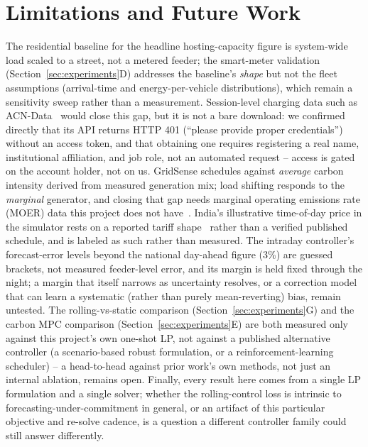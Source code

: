 \documentclass[journal]{IEEEtran}
\begin{document}
\section{Limitations and Future Work}
\label{sec:limitations}

The residential baseline for the headline hosting-capacity figure is system-wide load scaled to a street, not a metered feeder; the smart-meter validation (Section~\ref{sec:experiments}D) addresses the baseline's \emph{shape} but not the fleet assumptions (arrival-time and energy-per-vehicle distributions), which remain a sensitivity sweep rather than a measurement. Session-level charging data such as ACN-Data~\cite{leeacndata} would close this gap, but it is not a bare download: we confirmed directly that its API returns HTTP 401 (``please provide proper credentials'') without an access token, and that obtaining one requires registering a real name, institutional affiliation, and job role, not an automated request -- access is gated on the account holder, not on us. GridSense schedules against \emph{average} carbon intensity derived from measured generation mix; load shifting responds to the \emph{marginal} generator, and closing that gap needs marginal operating emissions rate (MOER) data this project does not have~\cite{watttime_moer}. India's illustrative time-of-day price in the simulator rests on a reported tariff shape~\cite{ceew2025tariff,merc2025} rather than a verified published schedule, and is labeled as such rather than measured. The intraday controller's forecast-error levels beyond the national day-ahead figure (3\%) are guessed brackets, not measured feeder-level error, and its margin is held fixed through the night; a margin that itself narrows as uncertainty resolves, or a correction model that can learn a systematic (rather than purely mean-reverting) bias, remain untested. The rolling-vs-static comparison (Section~\ref{sec:experiments}G) and the carbon MPC comparison (Section~\ref{sec:experiments}E) are both measured only against this project's own one-shot LP, not against a published alternative controller (a scenario-based robust formulation, or a reinforcement-learning scheduler) -- a head-to-head against prior work's own methods, not just an internal ablation, remains open. Finally, every result here comes from a single LP formulation and a single solver; whether the rolling-control loss is intrinsic to forecasting-under-commitment in general, or an artifact of this particular objective and re-solve cadence, is a question a different controller family could still answer differently.
\end{document}
